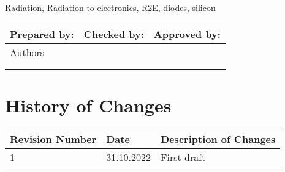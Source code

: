 


\maketitle

\begin{NoteAbstract}


\end{NoteAbstract}

\begin{Keywords}
Radiation, Radiation to electronics, R2E, diodes, silicon
\end{Keywords}
\vspace{4cm}
\begin{table}[h!]
\begin{tabularx}{\columnwidth}{X|X|X}
Prepared by: & Checked by: & Approved by: \\ \midrule
  Authors           &             &              \\
             &             &              \\
             &             &              \\
\end{tabularx}
\end{table}
\newpage
\chapter*{History of Changes}
\begin{table}[h!]
\begin{tabularx}{\columnwidth}{X|X|X}
Revision Number & Date & Description of Changes \\ \midrule
1 &      31.10.2022       &       First draft       \\
\end{tabularx}
\end{table}
\newpage
\tableofcontents


\newpage